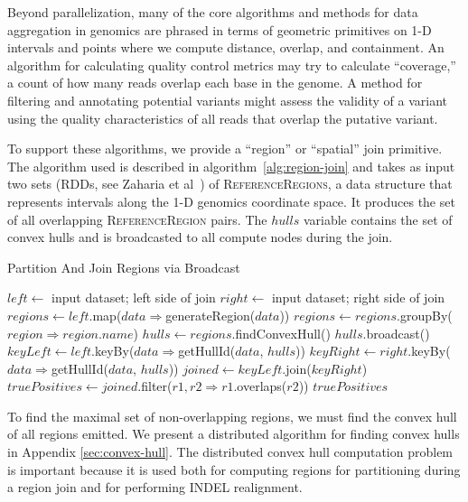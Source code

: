 \documentclass[phd]{ucbthesis}
\begin{document}
Beyond parallelization, many of the core algorithms and methods for data aggregation in genomics are phrased
in terms of geometric primitives on 1-D intervals and points where we compute distance, overlap, and
containment.  An algorithm for calculating quality control metrics may try to calculate ``coverage,'' a count
of how many reads overlap each base in the genome. A method for filtering and annotating potential variants
might assess the validity of a variant using the quality characteristics of all reads that overlap the putative variant.

To support these algorithms, we provide a ``region'' or ``spatial'' join primitive. The algorithm used is described
in algorithm~\ref{alg:region-join} and takes as input two sets (RDDs, see Zaharia et al~\cite{zaharia12}) of
\textsc{ReferenceRegions}, a data structure that represents intervals along the 1-D genomics coordinate
space. It produces the set of all overlapping \textsc{ReferenceRegion} pairs. The $hulls$ variable contains
the set of convex hulls and is broadcasted to all compute nodes during the join.

\begin{algorithm}
\caption{Partition And Join Regions via Broadcast}
\label{alg:region-join}
\begin{algorithmic}
\STATE $left \leftarrow$ input dataset; left side of join
\STATE $right \leftarrow$ input dataset; right side of join
\STATE $regions \leftarrow left$.map($data \Rightarrow $generateRegion($data$))
\STATE $regions \leftarrow regions$.groupBy($region \Rightarrow region$.$name$)
\STATE $hulls \leftarrow regions$.findConvexHull()
\STATE $hulls$.broadcast()
\STATE $keyLeft \leftarrow left$.keyBy($data \Rightarrow $getHullId($data$, $hulls$))
\STATE $keyRight \leftarrow right$.keyBy($data \Rightarrow $getHullId($data$, $hulls$))
\STATE $joined \leftarrow keyLeft$.join($keyRight$)
\STATE $truePositives \leftarrow joined$.filter($r1, r2 \Rightarrow r1$.overlaps($r2$))
\RETURN $truePositives$
\end{algorithmic}
\end{algorithm}

To find the maximal set of non-overlapping regions, we must find the convex hull of all regions emitted.
We present a distributed algorithm for finding convex hulls in Appendix \ref{sec:convex-hull}. The
distributed convex hull computation problem is important because it is used both for computing regions
for partitioning during a region join and for performing INDEL realignment.
\end{document}
